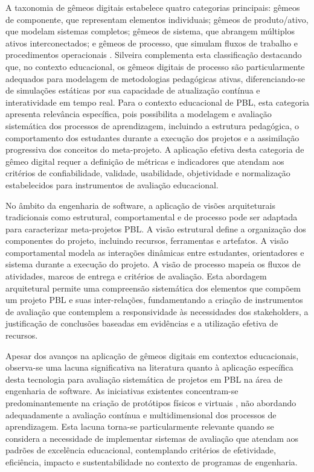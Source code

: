 \documentclass[12pt, a4paper, oneside, brazilian]{abntex2}
\begin{document}
A taxonomia de gêmeos digitais estabelece quatro categorias principais: gêmeos de componente, que representam elementos individuais; gêmeos de produto/ativo, que modelam sistemas completos; gêmeos de sistema, que abrangem múltiplos ativos interconectados; e gêmeos de processo, que simulam fluxos de trabalho e procedimentos operacionais \cite{barricelli2019}. Silveira \cite{silveira2024panorama} complementa esta classificação destacando que, no contexto educacional, os gêmeos digitais de processo são particularmente adequados para modelagem de metodologias pedagógicas ativas, diferenciando-se de simulações estáticas por sua capacidade de atualização contínua e interatividade em tempo real. Para o contexto educacional de PBL, esta categoria apresenta relevância específica, pois possibilita a modelagem e avaliação sistemática dos processos de aprendizagem, incluindo a estrutura pedagógica, o comportamento dos estudantes durante a execução dos projetos e a assimilação progressiva dos conceitos do meta-projeto. A aplicação efetiva desta categoria de gêmeo digital requer a definição de métricas e indicadores que atendam aos critérios de confiabilidade, validade, usabilidade, objetividade e normalização estabelecidos para instrumentos de avaliação educacional.

No âmbito da engenharia de software, a aplicação de visões arquiteturais tradicionais como estrutural, comportamental e de processo pode ser adaptada para caracterizar meta-projetos PBL. A visão estrutural define a organização dos componentes do projeto, incluindo recursos, ferramentas e artefatos. A visão comportamental modela as interações dinâmicas entre estudantes, orientadores e sistema durante a execução do projeto. A visão de processo mapeia os fluxos de atividades, marcos de entrega e critérios de avaliação. Esta abordagem arquitetural permite uma compreensão sistemática dos elementos que compõem um projeto PBL e suas inter-relações, fundamentando a criação de instrumentos de avaliação que contemplem a responsividade às necessidades dos stakeholders, a justificação de conclusões baseadas em evidências e a utilização efetiva de recursos.

Apesar dos avanços na aplicação de gêmeos digitais em contextos educacionais, observa-se uma lacuna significativa na literatura quanto à aplicação específica desta tecnologia para avaliação sistemática de projetos em PBL na área de engenharia de software. As iniciativas existentes concentram-se predominantemente na criação de protótipos físicos e virtuais \cite{bachmann2023}, não abordando adequadamente a avaliação contínua e multidimensional dos processos de aprendizagem. Esta lacuna torna-se particularmente relevante quando se considera a necessidade de implementar sistemas de avaliação que atendam aos padrões de excelência educacional, contemplando critérios de efetividade, eficiência, impacto e sustentabilidade no contexto de programas de engenharia.
\end{document}
